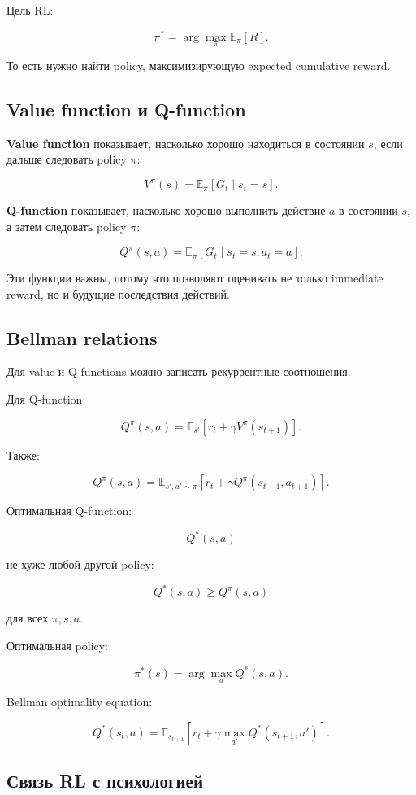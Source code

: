 \documentclass[a4paper,12pt]{article}
\begin{document}
Цель RL:

\[
\pi^*
=
\arg\max_\pi
\mathbb{E}_{\pi}[R].
\]

То есть нужно найти policy, максимизирующую expected cumulative reward.

\subsection{Value function и Q-function}

\textbf{Value function} показывает, насколько хорошо находиться в состоянии \(s\), если дальше следовать policy \(\pi\):

\[
V^\pi(s)
=
\mathbb{E}_{\pi}
[
G_t \mid s_t=s
].
\]

\textbf{Q-function} показывает, насколько хорошо выполнить действие \(a\) в состоянии \(s\), а затем следовать policy \(\pi\):

\[
Q^\pi(s,a)
=
\mathbb{E}_{\pi}
[
G_t \mid s_t=s, a_t=a
].
\]

Эти функции важны, потому что позволяют оценивать не только immediate reward, но и будущие последствия действий.

\subsection{Bellman relations}

Для value и Q-functions можно записать рекуррентные соотношения.

Для Q-function:

\[
Q^\pi(s,a)
=
\mathbb{E}_{s'}
[
r_t + \gamma V^\pi(s_{t+1})
].
\]

Также:

\[
Q^\pi(s,a)
=
\mathbb{E}_{s',a'\sim\pi}
[
r_t + \gamma Q^\pi(s_{t+1},a_{t+1})
].
\]

Оптимальная Q-function:

\[
Q^*(s,a)
\]

не хуже любой другой policy:

\[
Q^*(s,a) \geq Q^\pi(s,a)
\]

для всех \(\pi, s, a\).

Оптимальная policy:

\[
\pi^*(s)
=
\arg\max_a Q^*(s,a).
\]

Bellman optimality equation:

\[
Q^*(s_t,a)
=
\mathbb{E}_{s_{t+1}}
\left[
r_t +
\gamma \max_{a'} Q^*(s_{t+1},a')
\right].
\]

\subsection{Связь RL с психологией}
\end{document}
